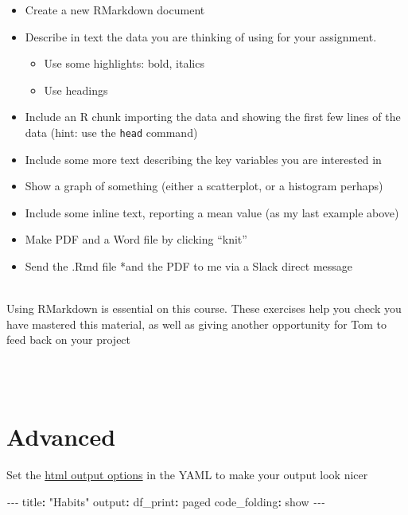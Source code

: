 \documentclass[
]{book}
\newenvironment{Shaded}{\begin{snugshade}}{\end{snugshade}}
\newcommand{\AttributeTok}[1]{\textcolor[rgb]{0.77,0.63,0.00}{#1}}
\newcommand{\FunctionTok}[1]{\textcolor[rgb]{0.00,0.00,0.00}{#1}}
\newcommand{\KeywordTok}[1]{\textcolor[rgb]{0.13,0.29,0.53}{\textbf{#1}}}
\newcommand{\PreprocessorTok}[1]{\textcolor[rgb]{0.56,0.35,0.01}{\textit{#1}}}
\newcommand{\StringTok}[1]{\textcolor[rgb]{0.31,0.60,0.02}{#1}}
\providecommand{\tightlist}{%
  \setlength{\itemsep}{0pt}\setlength{\parskip}{0pt}}
\newenvironment{info}
    {
    \hline\\
    }
    { 
    \\\\\hline
    }
\begin{document}
\begin{itemize}
\tightlist
\item
  Create a new RMarkdown document
\item
  Describe in text the data you are thinking of using for your assignment.

  \begin{itemize}
  \tightlist
  \item
    Use some highlights: bold, italics
  \item
    Use headings
  \end{itemize}
\item
  Include an R chunk importing the data and showing the first few lines of the data (hint: use the \texttt{head} command)
\item
  Include some more text describing the key variables you are interested in
\item
  Show a graph of something (either a scatterplot, or a histogram perhaps)
\item
  Include some inline text, reporting a mean value (as my last example above)
\item
  Make PDF and a Word file by clicking ``knit''
\item
  Send the .Rmd file *and the PDF to me via a Slack direct message
\end{itemize}

\begin{info}
Using RMarkdown is essential on this course. These exercises help you
check you have mastered this material, as well as giving another
opportunity for Tom to feed back on your project
\end{info}

\hypertarget{advanced}{%
\section{Advanced}\label{advanced}}

Set the \href{https://bookdown.org/yihui/rmarkdown/html-document.html}{html output options} in the YAML to make your output look nicer

\begin{Shaded}
\begin{Highlighting}[]
\PreprocessorTok{{-}{-}{-}}
\FunctionTok{title}\KeywordTok{:}\AttributeTok{ }\StringTok{"Habits"}
\FunctionTok{output}\KeywordTok{:}
\AttributeTok{  }\FunctionTok{df\_print}\KeywordTok{:}\AttributeTok{ }\StringTok{\textquotesingle{}paged\textquotesingle{}}
\AttributeTok{  }\FunctionTok{code\_folding}\KeywordTok{:}\AttributeTok{ }\StringTok{\textquotesingle{}show\textquotesingle{}}
\PreprocessorTok{{-}{-}{-}}
\end{Highlighting}
\end{Shaded}
\end{document}
